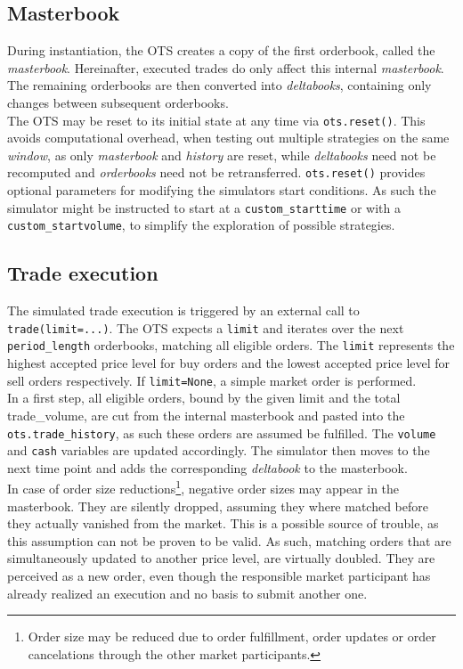 \subsection{Masterbook}
During instantiation, the \ac{OTS} creates a copy of the first orderbook, called the \emph{masterbook}. Hereinafter, executed trades do only affect this internal \emph{masterbook}. The remaining orderbooks are then converted into \emph{deltabooks}, containing only changes between subsequent orderbooks.\\

The \ac{OTS} may be reset to its initial state at any time via \lstinline!ots.reset()!. This avoids computational overhead, when testing out multiple strategies on the same \emph{window}, as only \emph{masterbook} and \emph{history} are reset, while \emph{deltabooks} need not be recomputed and \emph{orderbooks} need not be retransferred. \lstinline!ots.reset()! provides optional parameters for modifying the simulators start conditions. As such the simulator might be instructed to start at a \lstinline!custom_starttime! or with a \lstinline!custom_startvolume!, to simplify the exploration of possible strategies.

\subsection{Trade execution}
\label{chap:tradeexecution}
The simulated trade execution is triggered by an external call to \lstinline!trade(limit=...)!. The \ac{OTS} expects a \lstinline!limit! and iterates over the next \lstinline!period_length! orderbooks, matching all eligible orders. The \lstinline!limit! represents the highest accepted price level for buy orders and the lowest accepted price level for sell orders respectively. If \lstinline!limit=None!, a simple market order is performed.\\

In a first step, all eligible orders, bound by the given limit and the total trade\_volume, are cut from the internal masterbook and pasted into the \lstinline!ots.trade_history!, as such these orders are assumed be fulfilled. The \lstinline!volume! and \lstinline!cash! variables are updated accordingly.
The simulator then moves to the next time point and adds the corresponding \emph{deltabook} to the masterbook.\\

In case of order size reductions\footnote{Order size may be reduced due to order fulfillment, order updates or order cancelations through the other market participants.}, negative order sizes may appear in the masterbook. They are silently dropped, assuming they where matched before they actually vanished from the market. This is a possible source of trouble, as this assumption can not be proven to be valid. As such, matching orders that are simultaneously updated to another price level, are virtually doubled. They are perceived as a new order, even though the responsible market participant has already realized an execution and no basis to submit another one.\\

